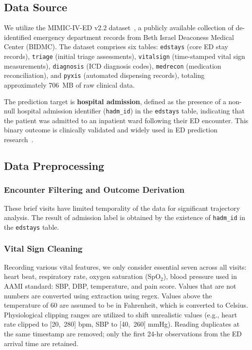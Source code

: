 \documentclass[conference]{IEEEtran}
\begin{document}
\subsection{Data Source}

We utilize the MIMIC-IV-ED v2.2 dataset~\cite{Johnson2023}, a publicly available collection of de-identified emergency department records from Beth Israel Deaconess Medical Center (BIDMC). The dataset comprises six tables: \texttt{edstays} (core ED stay records), \texttt{triage} (initial triage assessments), \texttt{vitalsign} (time-stamped vital sign measurements), \texttt{diagnosis} (ICD diagnosis codes), \texttt{medrecon} (medication reconciliation), and \texttt{pyxis} (automated dispensing records), totaling approximately 706~MB of raw clinical data.

The prediction target is \textbf{hospital admission}, defined as the presence of a non-null hospital admission identifier (\texttt{hadm\_id}) in the \texttt{edstays} table, indicating that the patient was admitted to an inpatient ward following their ED encounter. This binary outcome is clinically validated and widely used in ED prediction research~\cite{Xie2022}.

\subsection{Data Preprocessing}

\subsubsection{Encounter Filtering and Outcome Derivation}
These brief visits have limited temporality of the data for significant trajectory analysis. The result of admission label is obtained by the existence of \texttt{hadm\_id} in the \texttt{edstays} table.

\subsubsection{Vital Sign Cleaning}
Recording various vital features, we only consider essential seven across all visits: heart beat, respiratory rate, oxygen saturation (SpO$_2$), blood pressure used in AAMI standard: SBP, DBP, temperature, and pain score. Values that are not numbers are converted using extraction using regex. Values above the temperature of 60 are assumed to be in Fahrenheit, which is converted to Celsius. Physiological clipping ranges are utilized to shift unrealistic values (e.g., heart rate clipped to [20,~280] bpm, SBP to [40,~260] mmHg). Reading duplicates at the same timestamp are removed; only the first 24-hr observations from the ED arrival time are retained.
\end{document}
